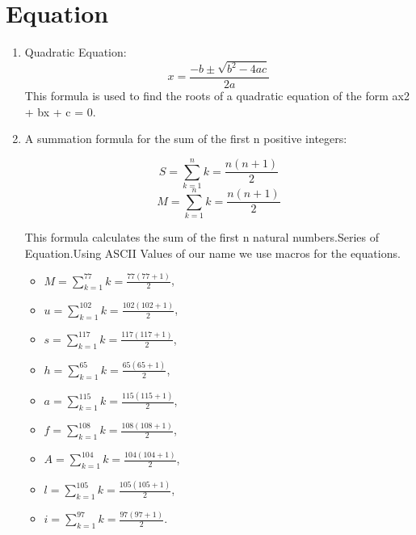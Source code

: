 \documentclass[12pt,a4paper]{article}
\begin{document}
	\section{Equation}
	\begin{enumerate}
		\item Quadratic Equation:
		\begin{equation}
			x=\frac{-b\pm \sqrt{b^2-4ac}}{2a}
		\end{equation}
		This formula is used to find the roots of a quadratic equation of the form ax2 + bx + c = 0.
		\newpage
		\item A summation formula for the sum of the first n positive integers:
		
		\begin{equation}
			S=\sum_{k=1}^{n}k=\frac{n(n+1)}{2}
		\end{equation}
		\begin{equation}
			M = \sum_{k=1}^{n} k = \frac{n(n+1)}{2}
			
		\end{equation}
		
		\vspace{1cm}
		This formula calculates the sum of the first n natural numbers.Series of Equation.Using ASCII Values of our name we use macros for the equations.
		\newcommand{\ascII}[2]{#2=\sum_{k=1}^{#1}k=\frac{#1(#1+1)}{2}}
		\begin{multicols}{2}
			\begin{itemize}
				\item[] \space$\ascII{77}{M}$,\item[] \space$\ascII{102}{u}$,
				\item[] \space$\ascII{117}{s}$,\item[] \space$\ascII{65}{h}$,
				\item[]\space $\ascII{115}{a}$,\item[]\space $\ascII{108}{f}$,
				\item[] \space$\ascII{104}{A}$,\item[] \space$\ascII{105}{l}$,
				\item[] \space$\ascII{97}{i}$.
				
		\end{itemize}\end{multicols}
		
	\end{enumerate}
	
\end{document}
